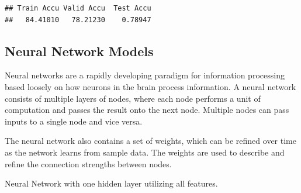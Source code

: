 \documentclass[
]{book}
\begin{document}
\begin{verbatim}
## Train Accu Valid Accu  Test Accu 
##   84.41010   78.21230    0.78947
\end{verbatim}

\hypertarget{neural-network-models}{%
\subsection*{Neural Network Models}\label{neural-network-models}}


Neural networks are a rapidly developing paradigm for information processing based loosely on how neurons in the brain process information. A neural network consists of multiple layers of nodes, where each node performs a unit of computation and passes the result onto the next node. Multiple nodes can pass inputs to a single node and vice versa.

The neural network also contains a set of weights, which can be refined over time as the network learns from sample data. The weights are used to describe and refine the connection strengths between nodes.

Neural Network with one hidden layer utilizing all features.
\end{document}
